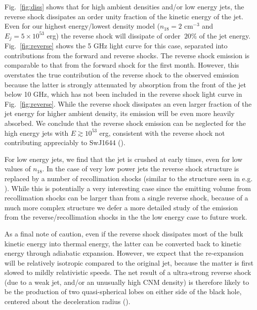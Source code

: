 \documentclass[usenatbib,fleqn]{mnras}
\begin{document}
Fig.~\ref{fig:diss} shows that for high ambient densities and/or low
energy jets, the reverse shock dissipates an order unity fraction of
the kinetic energy of the jet.  Even for our highest energy/lowest
density model ($n_{18}=2$ cm$^{-3}$ and $E_j=5\times 10^{53}$ erg) the
reverse shock will dissipate of order $~20\%$ of the jet energy.
Fig.~\ref{fig:reverse} shows the 5 GHz light curve for this case,
separated into contributions from the forward and reverse shocks.  The
reverse shock emission is comparable to that from the forward shock
for the first month.  However, this overstates the true contribution
of the reverse shock to the observed emission because the latter is
strongly attenuated by absorption from the front of the jet below 10
GHz, which has not been included in the reverse shock light curve in
Fig.~\ref{fig:reverse}.  While the reverse shock dissipates an even
larger fraction of the jet energy for higher ambient density, its
emission will be even more heavily absorbed.  We conclude that the
reverse shock emission can be neglected for the high energy jets with
$E\gtrsim 10^{53}$ erg, consistent with the reverse shock not
contributing appreciably to SwJ1644 (\citealt{Metzger+2012}).

For low energy jets, we find that the jet is crushed at early times,
even for low values of $n_{18}$. In the case of very low power jets
the reverse shock structure is replaced by a number of recollimation
shocks (similar to the structure seen in
e.g. \citealt{Mimica+2009}). While this is potentially a very
interesting case since the emitting volume from recollimation shocks
can be larger than from a single reverse shock, because of a much more
complex structure we defer a more detailed study of the emission from
the reverse/recollimation shocks in the the low energy case to future
work.

As a final note of caution, even if the reverse shock dissipates most
of the bulk kinetic energy into thermal energy, the latter can be
converted back to kinetic energy through adiabatic expansion.
However, we expect that the re-expansion will be relatively isotropic
compared to the original jet, because the matter is first slowed to
mildly relativistic speeds.  The net result of a ultra-strong reverse
shock (due to a weak jet, and/or an unusually high CNM density) is
therefore likely to be the production of two quasi-spherical lobes on
either side of the black hole, centered about the deceleration radius
(\citealt{Giannios&Metzger2011}).
\end{document}
